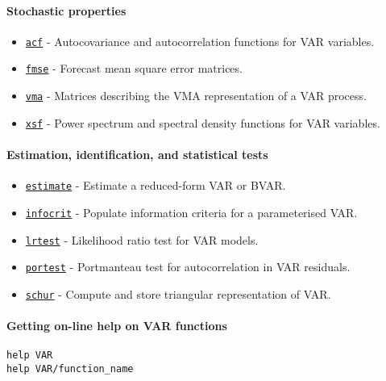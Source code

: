 \paragraph{Stochastic properties}\label{stochastic-properties}

\begin{itemize}
\itemsep1pt\parskip0pt
\item
  \href{VAR/acf}{\texttt{acf}} - Autocovariance and autocorrelation
  functions for VAR variables.
\item
  \href{VAR/fmse}{\texttt{fmse}} - Forecast mean square error matrices.
\item
  \href{VAR/vma}{\texttt{vma}} - Matrices describing the VMA
  representation of a VAR process.
\item
  \href{VAR/xsf}{\texttt{xsf}} - Power spectrum and spectral density
  functions for VAR variables.
\end{itemize}

\paragraph{Estimation, identification, and statistical
tests}\label{estimation-identification-and-statistical-tests}

\begin{itemize}
\itemsep1pt\parskip0pt
\item
  \href{VAR/estimate}{\texttt{estimate}} - Estimate a reduced-form VAR
  or BVAR.
\item
  \href{VAR/infocrit}{\texttt{infocrit}} - Populate information criteria
  for a parameterised VAR.
\item
  \href{VAR/lrtest}{\texttt{lrtest}} - Likelihood ratio test for VAR
  models.
\item
  \href{VAR/portest}{\texttt{portest}} - Portmanteau test for
  autocorrelation in VAR residuals.
\item
  \href{VAR/schur}{\texttt{schur}} - Compute and store triangular
  representation of VAR.
\end{itemize}

\paragraph{Getting on-line help on VAR
functions}\label{getting-on-line-help-on-var-functions}

\begin{verbatim}
help VAR
help VAR/function_name
\end{verbatim}




